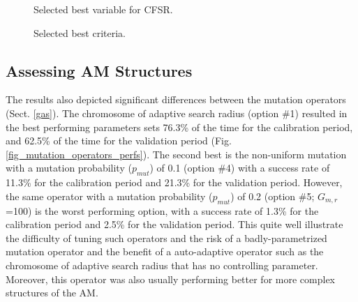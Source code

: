 \documentclass[draft]{agujournal2019}
\begin{document}
\begin{figure}[h]
	\noindent{}
	\caption{Selected best variable for CFSR.}
	\label{fig_best_cfsr}
\end{figure}

\begin{figure}[h]
	\noindent{}
	\caption{Selected best criteria.}
	\label{fig_criteria}
\end{figure}

\subsection{Assessing AM Structures}
\label{structures}




The results also depicted significant differences between the mutation operators (Sect. \ref{gas}). The chromosome of adaptive search radius (option \#1) resulted in the best performing parameters sets 76.3\% of the time for the calibration period, and 62.5\% of the time for the validation period (Fig. \ref{fig_mutation_operators_perfs}).  The second best is the non-uniform mutation with a mutation probability ($p_{mut}$) of 0.1 (option \#4) with a success rate of 11.3\% for the calibration period and 21.3\% for the validation period. However, the same operator with a  mutation probability ($p_{mut}$) of 0.2 (option \#5; $G_{m,r}$=100) is the worst performing option, with a success rate of 1.3\% for the calibration period and 2.5\% for the validation period. This quite well illustrate the difficulty of tuning such operators and the risk of a badly-parametrized mutation operator and the benefit of a auto-adaptive operator such as the chromosome of adaptive search radius that has no controlling parameter. Moreover, this operator was also usually performing better for more complex structures of the AM.
\end{document}
